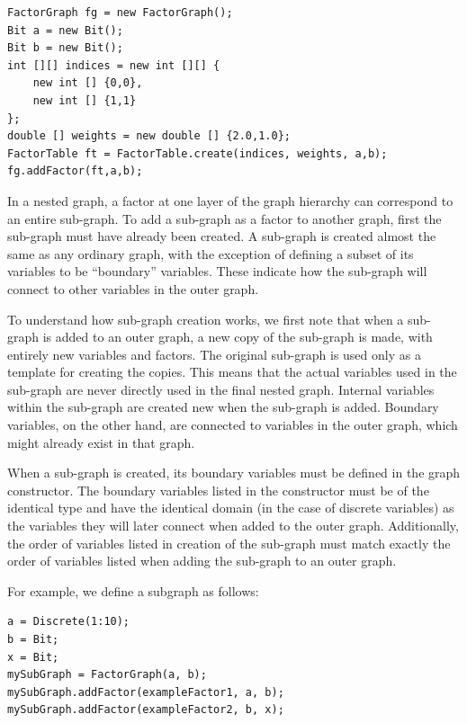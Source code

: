 \fi

\ifjava
\begin{lstlisting}
FactorGraph fg = new FactorGraph();
Bit a = new Bit();
Bit b = new Bit();
int [][] indices = new int [][] {
	new int [] {0,0},
	new int [] {1,1}
};
double [] weights = new double [] {2.0,1.0};
FactorTable ft = FactorTable.create(indices, weights, a,b);
fg.addFactor(ft,a,b);
\end{lstlisting}
\fi
   


\label{sec:usingSubGraphs}

In a nested graph, a factor at one layer of the graph hierarchy can correspond to an entire sub-graph.  To add a sub-graph as a factor to another graph, first the sub-graph must have already been created.  A sub-graph is created almost the same as any ordinary graph, with the exception of defining a subset of its variables to be ``boundary'' variables.  These indicate how the sub-graph will connect to other variables in the outer graph.

To understand how sub-graph creation works, we first note that when a sub-graph is added to an outer graph, a new copy of the sub-graph is made, with entirely new variables and factors.  The original sub-graph is used only as a template for creating the copies.  This means that the actual variables used in the sub-graph are never directly used in the final nested graph.  Internal variables within the sub-graph are created new when the sub-graph is added. Boundary variables, on the other hand, are connected to variables in the outer graph, which might already exist in that graph.

When a sub-graph is created, its boundary variables must be defined in the graph constructor.  The boundary variables listed in the constructor must be of the identical type and have the identical domain (in the case of discrete variables) as the variables they will later connect when added to the outer graph.  Additionally, the order of variables listed in creation of the sub-graph must match exactly the order of variables listed when adding the sub-graph to an outer graph.

For example, we define a subgraph as follows:

\ifmatlab

\begin{lstlisting}
a = Discrete(1:10);
b = Bit;
x = Bit;
mySubGraph = FactorGraph(a, b);
mySubGraph.addFactor(exampleFactor1, a, b);
mySubGraph.addFactor(exampleFactor2, b, x);
\end{lstlisting}

